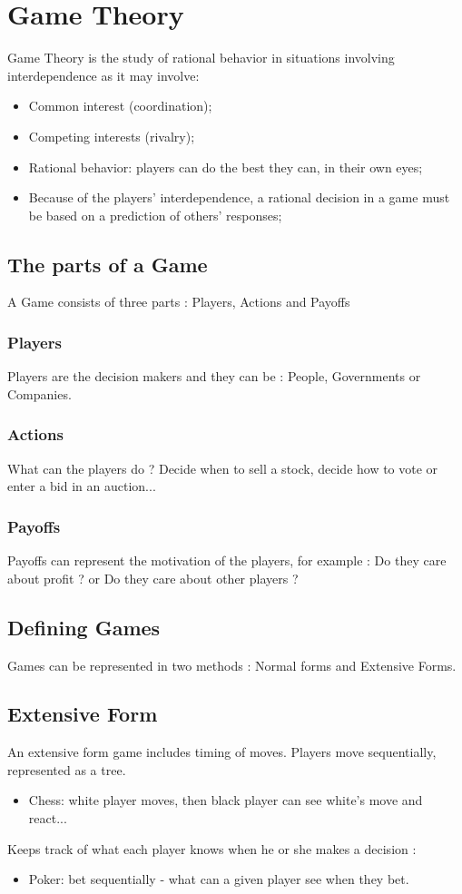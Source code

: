 \section{Game Theory}
Game Theory is the study of rational behavior in situations involving interdependence as it may involve:
\begin{itemize}
\item Common interest (coordination);
\item Competing interests (rivalry);
\item Rational behavior: players can do the best they can, in their own eyes;
\item Because of the players' interdependence, a rational decision in a game must be based on a prediction of others' responses;
\end{itemize}
\clearpage

\subsection{The parts of a Game} 
A Game consists of three parts : 
Players, Actions and Payoffs
\subsubsection{Players}
Players are the decision makers and they can be : People, Governments or Companies.
\subsubsection{Actions}
What can the players do ?
Decide when to sell a stock, decide how to vote or enter a bid in an auction...
\subsubsection{Payoffs}
Payoffs can represent the motivation of the players, for example : Do they care about profit ? or Do they care about other players ? 

\subsection{Defining Games} Games can be represented in two methods : Normal forms and Extensive Forms.

\subsection{Extensive Form}
An extensive form game includes timing of moves. 
Players move sequentially, represented as a tree.
\begin{itemize}
\item Chess: white player moves, then black player can see white's move and react...
\end{itemize}
Keeps track of what each player knows when he or she makes a decision :
\begin{itemize}
\item Poker: bet sequentially - what can a given player see when they bet. 
\end{itemize}

